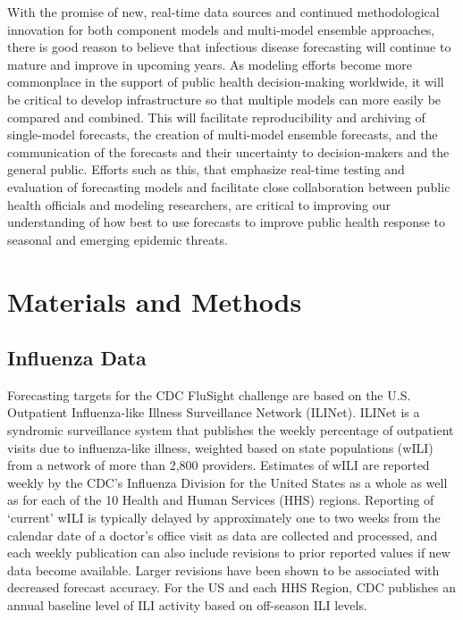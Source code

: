 \documentclass{article}\usepackage[]{graphicx}\usepackage[]{color}
\begin{document}
With the promise of new, real-time data sources and continued methodological innovation for both component models and multi-model ensemble approaches, there is good reason to believe that infectious disease forecasting will continue to mature and improve in upcoming years.
As modeling efforts become more commonplace in the support of public health decision-making worldwide, it will be critical to develop infrastructure so that multiple models can more easily be compared and combined.
This will facilitate reproducibility and archiving of single-model forecasts, the creation of multi-model ensemble forecasts, and the communication of the forecasts and their uncertainty to decision-makers and the general public.
Efforts such as this, that emphasize real-time testing and evaluation of forecasting models and facilitate close collaboration between public health officials and modeling researchers, are critical to improving our understanding of how best to use forecasts to improve public health response to seasonal and emerging epidemic threats.

\section*{Materials and Methods}

\subsection*{Influenza Data}
Forecasting targets for the CDC FluSight challenge are based on the U.S. Outpatient Influenza-like Illness Surveillance Network (ILINet). 
ILINet is a syndromic surveillance system that publishes the weekly percentage of outpatient visits due to influenza-like illness, weighted based on state populations (wILI) from a network of more than 2,800 providers. 
Estimates of wILI are reported weekly by the CDC's Influenza Division for the United States as a whole as well as for each of the 10 Health and Human Services (HHS) regions. 
Reporting of `current' wILI is typically delayed by approximately one to two weeks from the calendar date of a doctor's office visit as data are collected and processed, and each weekly publication can also include revisions to prior reported values if new data become available. 
Larger revisions have been shown to be associated with decreased forecast accuracy.\cite{reich2019collaborative}
For the US and each HHS Region, CDC publishes an annual baseline level of ILI activity based on off-season ILI levels.\cite{surv2017} 
\end{document}
